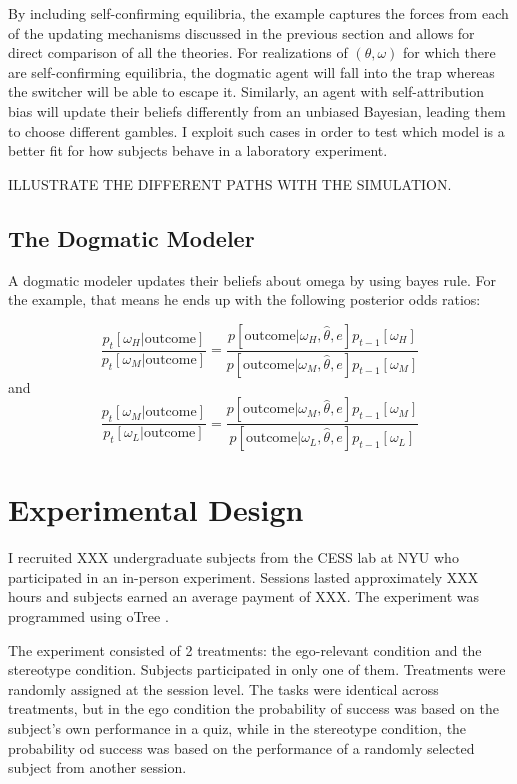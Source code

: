 \documentclass[
  12pt,
]{article}
\begin{document}
By including self-confirming equilibria, the example captures the forces
from each of the updating mechanisms discussed in the previous section
and allows for direct comparison of all the theories. For realizations
of \((\theta, \omega)\) for which there are self-confirming equilibria,
the dogmatic agent will fall into the trap whereas the switcher will be
able to escape it. Similarly, an agent with self-attribution bias will
update their beliefs differently from an unbiased Bayesian, leading them
to choose different gambles. I exploit such cases in order to test which
model is a better fit for how subjects behave in a laboratory
experiment.

ILLUSTRATE THE DIFFERENT PATHS WITH THE SIMULATION.

\hypertarget{the-dogmatic-modeler-1}{%
\subsection{The Dogmatic Modeler}\label{the-dogmatic-modeler-1}}

A dogmatic modeler updates their beliefs about omega by using bayes
rule. For the example, that means he ends up with the following
posterior odds ratios:

\begin{equation}
\frac{p_{t}[\omega_H|\text{outcome}]}{p_{t}[\omega_M|\text{outcome}]} = 
      \frac{p[\text{outcome}|\omega_H, \hat{\theta}, e]p_{t-1}[\omega_H]}{p[\text{outcome}|\omega_M, \hat{\theta}, e]p_{t-1}[\omega_M]}
\end{equation} and \begin{equation}
\frac{p_{t}[\omega_M|\text{outcome}]}{p_{t}[\omega_L|\text{outcome}]} = 
      \frac{p[\text{outcome}|\omega_M, \hat{\theta}, e]p_{t-1}[\omega_M]}{p[\text{outcome}|\omega_L, \hat{\theta}, e]p_{t-1}[\omega_L]}
\end{equation}

\hypertarget{experimental-design}{%
\section{Experimental Design}\label{experimental-design}}

I recruited XXX undergraduate subjects from the CESS lab at NYU who
participated in an in-person experiment. Sessions lasted approximately
XXX hours and subjects earned an average payment of XXX. The experiment
was programmed using oTree \citep{chen2016otree}.

The experiment consisted of 2 treatments: the ego-relevant condition and
the stereotype condition. Subjects participated in only one of them.
Treatments were randomly assigned at the session level. The tasks were
identical across treatments, but in the ego condition the probability of
success was based on the subject's own performance in a quiz, while in
the stereotype condition, the probability od success was based on the
performance of a randomly selected subject from another session.
\end{document}
